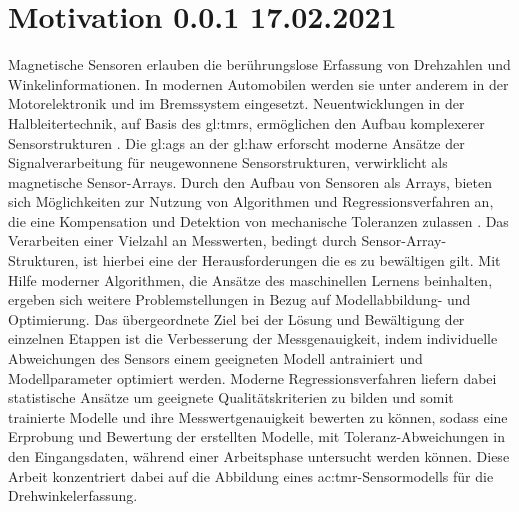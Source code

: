 %

\chapter{Motivation 0.0.1 17.02.2021}\label{ch:motivation}


Magnetische Sensoren erlauben die berührungslose Erfassung von Drehzahlen und Winkelinformationen. In modernen Automobilen werden sie unter anderem in der Motorelektronik und im Bremssystem eingesetzt. Neuentwicklungen in der Halbleitertechnik, auf Basis des \gls{gl:tmr}s, ermöglichen den Aufbau komplexerer Sensorstrukturen \cite{Schuethe2019}. Die \gls{gl:ags} an der \gls{gl:haw} erforscht moderne Ansätze der Signalverarbeitung für neugewonnene Sensorstrukturen, verwirklicht als magnetische Sensor-Arrays. Durch den Aufbau von Sensoren als Arrays, bieten sich Möglichkeiten zur Nutzung von Algorithmen und Regressionsverfahren an, die eine Kompensation und Detektion von mechanische Toleranzen zulassen \cite{Schuethe2020}.
\newline
Das Verarbeiten einer Vielzahl an Messwerten, bedingt durch Sensor-Array-Strukturen, ist hierbei eine der Herausforderungen die es zu bewältigen gilt. Mit Hilfe moderner Algorithmen, die Ansätze des maschinellen Lernens beinhalten, ergeben sich weitere Problemstellungen in Bezug auf Modellabbildung- und Optimierung.
Das übergeordnete Ziel bei der Lösung und Bewältigung der einzelnen Etappen ist die Verbesserung der Messgenauigkeit, indem individuelle Abweichungen des Sensors einem geeigneten Modell antrainiert und Modellparameter optimiert werden.
\newline
Moderne Regressionsverfahren liefern dabei statistische Ansätze um geeignete Qualitätskriterien zu bilden und somit trainierte Modelle und ihre Messwertgenauigkeit bewerten zu können, sodass eine Erprobung und Bewertung der erstellten Modelle, mit Toleranz-Abweichungen in den Eingangsdaten, während einer Arbeitsphase untersucht werden können.
Diese Arbeit konzentriert dabei auf die Abbildung eines \gls{ac:tmr}-Sensormodells für die Drehwinkelerfassung.


\clearpage



